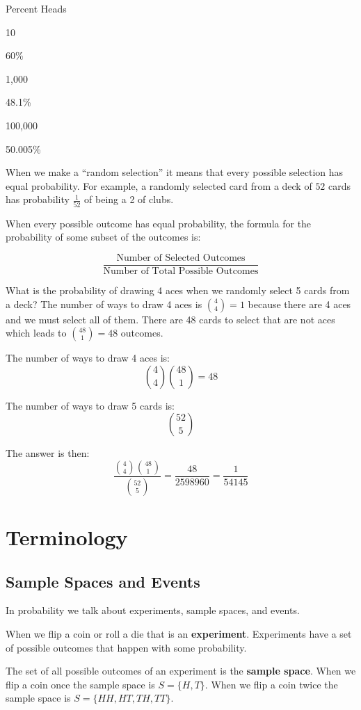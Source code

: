 \documentclass[
]{book}
\begin{document}
Percent Heads

10

60\%

1,000

48.1\%

100,000

50.005\%

When we make a ``random selection'' it means that every possible selection has equal probability. For example, a randomly selected card from a deck of \(52\) cards has probability \(\frac{1}{52}\) of being a 2 of clubs.

When every possible outcome has equal probability, the formula for the probability of some subset of the outcomes is:

\[\frac{\text{Number of Selected Outcomes}}{\text{Number of Total Possible Outcomes}}\]

What is the probability of drawing 4 aces when we randomly select 5 cards from a deck? The number of ways to draw 4 aces is \({4 \choose 4} = 1\) because there are 4 aces and we must select all of them. There are 48 cards to select that are not aces which leads to \({48 \choose 1} = 48\) outcomes.

The number of ways to draw 4 aces is:
\[{4 \choose 4}{48 \choose 1} = 48\]

The number of ways to draw 5 cards is:
\[{52 \choose 5}\]

The answer is then:
\[\frac{{4 \choose 4}{48 \choose 1}}{{52 \choose 5}} = \frac{48}{2598960} = \frac{1}{54145}\]

\hypertarget{terminology}{%
\section{Terminology}\label{terminology}}

\hypertarget{sample-spaces-and-events}{%
\subsection{Sample Spaces and Events}\label{sample-spaces-and-events}}

In probability we talk about experiments, sample spaces, and events.

When we flip a coin or roll a die that is an \textbf{experiment}. Experiments have a set of possible outcomes that happen with some probability.

The set of all possible outcomes of an experiment is the \textbf{sample space}. When we flip a coin once the sample space is \(S=\{H,T\}\). When we flip a coin twice the sample space is \(S=\{HH,HT,TH,TT\}\).
\end{document}
